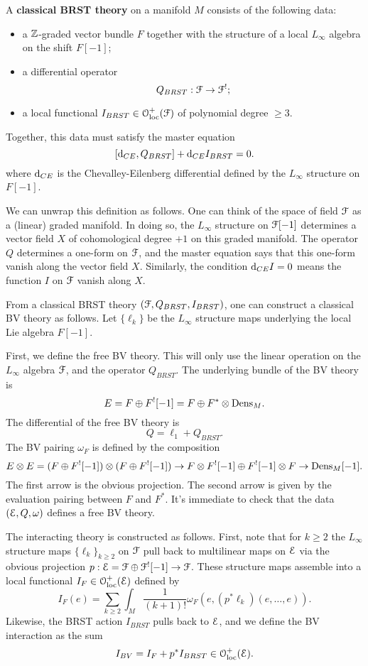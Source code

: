 \documentclass[10pt, oneside]{article}
\begin{document}
\begin{dfn}
A {\bf classical BRST theory} on a manifold $M$ consists of the following data:
\begin{itemize}
\item a $\mathbb Z$-graded vector bundle $F$ together with the structure of a local $L_\infty$ algebra on the shift $F[-1]$;
\item a differential operator
\[
Q_{BRST} : \mathcal F \to \mathcal F^!  ;
\]
\item a local functional $I_{BRST} \in \mathcal{O}_{\rm loc}^+(\mathcal F)$ of polynomial degree $\geq 3$.
\end{itemize}
Together, this data must satisfy the master equation
\[
[{\rm d}_{CE}, Q_{BRST}] + {\rm d}_{CE} I_{BRST} = 0 .
\]
where ${\rm d}_{CE}$ is the Chevalley-Eilenberg differential defined by the $L_\infty$ structure on $F[-1]$. 
\end{dfn}

We can unwrap this definition as follows. 
One can think of the space of field $\mathcal F$ as a (linear) graded manifold.
In doing so, the $L_\infty$ structure on $\mathcal F[-1]$ determines a vector field $X$ of cohomological degree $+1$ on this graded manifold. 
The operator $Q$ determines a one-form on $\mathcal F$, and the master equation says that this one-form vanish along the vector field $X$. 
Similarly, the condition ${\rm d}_{CE} I = 0$ means the function $I$ on $\mathcal F$ vanish along $X$. 

From a classical BRST theory $(\mathcal F, Q_{BRST}, I_{BRST})$, one can construct a classical BV theory as follows. 
Let $\{\ell_k\}$ be the $L_\infty$ structure maps underlying the local Lie algebra $F[-1]$. 

First, we define the free BV theory. 
This will only use the linear operation on the $L_\infty$ algebra $\mathcal F$, and the operator $Q_{BRST}$. 
The underlying bundle of the BV theory is
\[
E = F \oplus F^! [-1] = F \oplus F^* \otimes {\rm Dens}_M .
\]
The differential of the free BV theory is
\[
Q = \ell_1 + Q_{BRST} .
\]
The BV pairing $\omega_{F}$ is defined by the composition
\[
E \otimes E = (F \oplus F^![-1]) \otimes (F \oplus F^![-1]) \to F \otimes F^! [-1] \oplus F^![-1] \otimes F \to {\rm Dens}_M [-1] .
\]
The first arrow is the obvious projection. 
The second arrow is given by the evaluation pairing between $F$ and $F^*$. 
It's immediate to check that the data $(\mathcal E, Q, \omega)$ defines a free BV theory. 

The interacting theory is constructed as follows.
First, note that for $k \geq 2$ the $L_\infty$ structure maps $\{\ell_k\}_{k \geq 2}$ on $\mathcal F$ pull back to multilinear maps on $\mathcal E$ via the obvious projection $p : \mathcal E = \mathcal F \oplus \mathcal F^![-1] \to \mathcal F$. 
These structure maps assemble into a local functional $I_F \in \mathcal{O}_{\rm loc}^+(\mathcal E)$ defined by
\[
I_{F} (e) = \sum_{k \geq 2} \int_M \frac{1}{(k+1)!} \omega_F(e, (p^*\ell_k) (e, \ldots, e)) . 
\] 
Likewise, the BRST action $I_{BRST}$ pulls back to $\mathcal E$, and we define the BV interaction as the sum
\[
I_{BV} = I_{F} + p^* I_{BRST} \in \mathcal{O}_{\rm loc}^+(\mathcal E) .
\]
\end{document}
